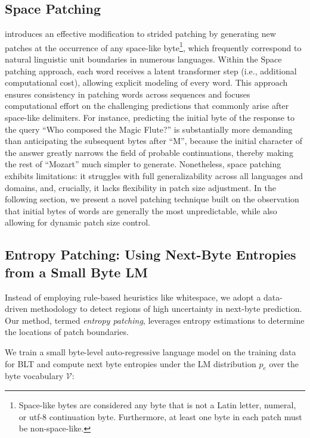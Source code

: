 \subsection{Space Patching}
\label{section:white-patch}

\citet{slagle2024spacebyte} introduces an effective modification to strided patching by generating new patches at the occurrence of any space-like byte\footnote{
    Space-like bytes are considered any byte that is not a Latin letter, numeral, or utf-8 continuation byte. Furthermore, at least one byte in each patch must be non-space-like.
}, which frequently correspond to natural linguistic unit boundaries in numerous languages. Within the Space patching approach, each word receives a latent transformer step (i.e., additional computational cost), allowing explicit modeling of every word. This approach ensures consistency in patching words across sequences and focuses computational effort on the challenging predictions that commonly arise after space-like delimiters. For instance, predicting the initial byte of the response to the query ``Who composed the Magic Flute?\uline{\hspace{.6em}}'' is substantially more demanding than anticipating the subsequent bytes after ``M'', because the initial character of the answer greatly narrows the field of probable continuations, thereby making the rest of ``Mozart'' much simpler to generate. Nonetheless, space patching exhibits limitations: it struggles with full generalizability across all languages and domains, and, crucially, it lacks flexibility in patch size adjustment. In the following section, we present a novel patching technique built on the observation that initial bytes of words are generally the most unpredictable, while also allowing for dynamic patch size control.

\subsection{Entropy Patching: Using Next-Byte Entropies from a Small Byte LM}
\label{section:dyn-patch}

Instead of employing rule-based heuristics like whitespace, we adopt a data-driven methodology to detect regions of high uncertainty in next-byte prediction. Our method, termed \textit{entropy patching}, leverages entropy estimations to determine the locations of patch boundaries.

We train a small byte-level auto-regressive language model on the training data for {\textsc BLT} and compute next byte entropies under the LM distribution $p_{e}$ over the byte vocabulary $\mathcal{V}$:

